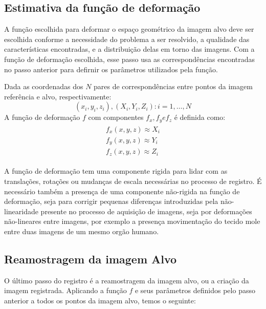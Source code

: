 \subsection{Estimativa da função de deformação}

  A função escolhida para deformar o espaço geométrico da imagem alvo deve ser
escolhida conforme a necessidade do problema a ser resolvido, a qualidade das
características encontradas, e a distribuição delas em torno das imagens. Com a
função de deformação escolhida, esse passo usa as correspondências encontradas
no passo anterior para defirnir os parâmetros utilizados pela função.

  Dada as coordenadas dos $N$ pares de correspondências entre pontos da imagem
referência e alvo, respectivamente:
\begin{equation}
  {(x_i, y_i, z_i), (X_i, Y_i, Z_i) : i = 1, \dots, N}
\end{equation}
  A função de deformação $f$ com componentes $f_x, f_y e f_z$ é definida como:
\begin{align}
  \begin{split}
    f_x(x, y, z) \approx X_i \\
    f_y(x, y, z) \approx Y_i \\
    f_z(x, y, z) \approx Z_i
  \end{split}
\end{align}

  A função de deformação tem uma componente rigida para lidar com as translações,
rotações ou mudanças de escala necessárias no processo de registro. É necessário
também a presença de uma componente não-rigida na função de deformação, seja para
corrigir pequenas diferenças introduzidas pela não-linearidade presente no
processo de aquisição de imagens, seja por deformações não-lineares entre imagens,
por exemplo a presença movimentação do tecido mole entre duas imagens de um mesmo
orgão humano.

\subsection{Reamostragem da imagem Alvo}

  O último passo do registro é a reamostragem da imagem alvo, ou a criação
da imagem registrada. Aplicando a função $f$ e seus parâmetros definidos pelo
passo anterior a todos os pontos da imagem alvo, temos o seguinte:

